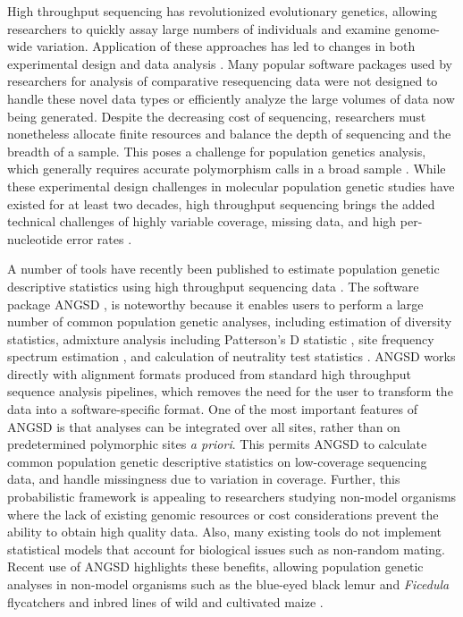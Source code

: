 \documentclass[10pt,a4paper]{article}
\begin{document}
High throughput sequencing has revolutionized evolutionary genetics, allowing researchers to quickly assay large numbers of individuals and examine genome-wide variation. 
Application of these approaches has led to changes in both experimental design and data analysis \citep{ekblom2011applications}. 
Many popular software packages used by researchers for analysis of comparative resequencing data \citep[see][]{excoffier2006computer} were not designed to handle these novel data types or efficiently analyze the large volumes of data now being generated. 
Despite the decreasing cost of sequencing, researchers must nonetheless allocate finite resources and balance the depth of sequencing and the breadth of a sample. 
This poses a challenge for population genetics analysis, which generally requires accurate polymorphism calls in a broad sample \citep{pluzhnikov1996optimal, felsenstein2006accuracy}. 
While these experimental design challenges in molecular population genetic studies have existed for at least two decades, high throughput sequencing brings the added technical challenges of highly variable coverage, missing data, and high per-nucleotide error rates \citep{lynch2008diversity, lynch2008diversity}.

A number of tools have recently been published to estimate population genetic descriptive statistics using high throughput sequencing data \citep{garrigan2013popbam, purcell2007plink, danecek2011variant, hutter2006genome}. The software package ANGSD \citet{korneliussen2014angsd}, is noteworthy because it enables users to perform a large number of common population genetic analyses, including estimation of diversity statistics, admixture analysis including Patterson's D statistic \citep{Durand:2011jd}, site frequency spectrum estimation \citep{pmid22911679}, and calculation of neutrality test statistics \citep{korneliussen_calculation_2013}. 
ANGSD works directly with alignment formats produced from standard high throughput sequence analysis pipelines, which removes the need for the user to transform the data into a software-specific format. 
One of the most important features of ANGSD is that analyses can be integrated over all sites, rather than on predetermined polymorphic sites \emph{a priori}. 
This permits ANGSD to calculate common population genetic descriptive statistics on low-coverage sequencing data, and handle missingness due to variation in coverage. 
Further, this probabilistic framework is appealing to researchers studying non-model organisms where the lack of existing genomic resources or cost considerations prevent the ability to obtain high quality data. 
Also, many existing tools do not implement statistical models that account for biological issues such as non-random mating. Recent use of ANGSD highlights these benefits, allowing population genetic analyses in non-model organisms such as the blue-eyed black lemur \citep{meyer2015evolutionary} and \textit{Ficedula} flycatchers \citep{burri2015linked} and inbred lines of wild and cultivated maize \citep{Beissinger031666}.
\end{document}
